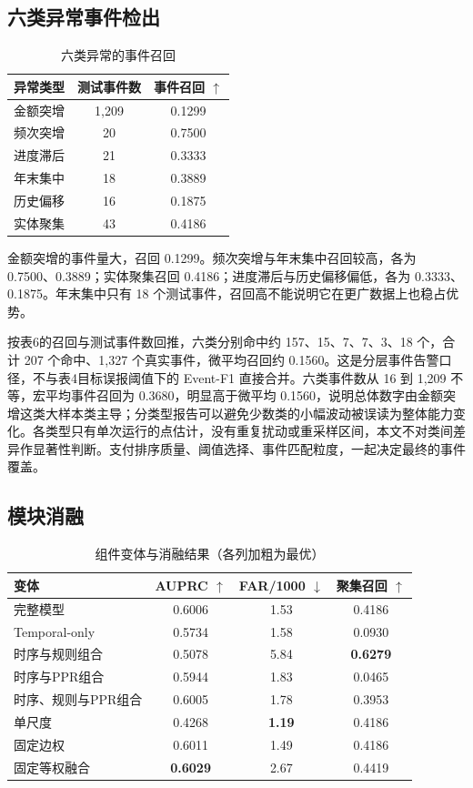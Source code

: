 \documentclass[twocolumn,11pt]{ctexart}
\begin{document}
\subsection{六类异常事件检出}
\begin{table}[t]
\centering\small
\caption{六类异常的事件召回}
\begin{tabular}{lcc}
\toprule
异常类型 & 测试事件数 & 事件召回 $\uparrow$ \\
\midrule
金额突增 & 1,209 & 0.1299 \\
频次突增 & 20 & 0.7500 \\
进度滞后 & 21 & 0.3333 \\
年末集中 & 18 & 0.3889 \\
历史偏移 & 16 & 0.1875 \\
实体聚集 & 43 & 0.4186 \\
\bottomrule
\end{tabular}
\end{table}

金额突增的事件量大，召回 0.1299。频次突增与年末集中召回较高，各为 0.7500、0.3889；实体聚集召回 0.4186；进度滞后与历史偏移偏低，各为 0.3333、0.1875。年末集中只有 18 个测试事件，召回高不能说明它在更广数据上也稳占优势。

按表6的召回与测试事件数回推，六类分别命中约 157、15、7、7、3、18 个，合计 207 个命中、1,327 个真实事件，微平均召回约 0.1560。这是分层事件告警口径，不与表4目标误报阈值下的 Event-F1 直接合并。六类事件数从 16 到 1,209 不等，宏平均事件召回为 0.3680，明显高于微平均 0.1560，说明总体数字由金额突增这类大样本类主导；分类型报告可以避免少数类的小幅波动被误读为整体能力变化。各类型只有单次运行的点估计，没有重复扰动或重采样区间，本文不对类间差异作显著性判断。支付排序质量、阈值选择、事件匹配粒度，一起决定最终的事件覆盖。

\subsection{模块消融}
\begin{table}[t]
\centering\small
\caption{组件变体与消融结果（各列加粗为最优）}
\begin{tabular}{lccc}
\toprule
变体 & AUPRC $\uparrow$ & FAR/1000 $\downarrow$ & 聚集召回 $\uparrow$ \\
\midrule
完整模型 & 0.6006 & 1.53 & 0.4186 \\
Temporal-only & 0.5734 & 1.58 & 0.0930 \\
时序与规则组合 & 0.5078 & 5.84 & \textbf{0.6279} \\
时序与PPR组合 & 0.5944 & 1.83 & 0.0465 \\
时序、规则与PPR组合 & 0.6005 & 1.78 & 0.3953 \\
单尺度 & 0.4268 & \textbf{1.19} & 0.4186 \\
固定边权 & 0.6011 & 1.49 & 0.4186 \\
固定等权融合 & \textbf{0.6029} & 2.67 & 0.4419 \\
\bottomrule
\end{tabular}
\end{table}
\end{document}
